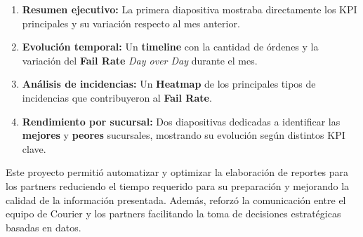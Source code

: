 \begin{enumerate}
	\item \textbf{Resumen ejecutivo:} La primera diapositiva mostraba directamente los KPI principales y su variación respecto al mes anterior.
	\item \textbf{Evolución temporal:} Un \textbf{timeline} con la cantidad de órdenes y la variación del \textbf{Fail Rate} \textit{Day over Day} durante el mes.
	\item \textbf{Análisis de incidencias:} Un \textbf{Heatmap} de los principales tipos de incidencias que contribuyeron al \textbf{Fail Rate}.
	\item \textbf{Rendimiento por sucursal:} Dos diapositivas dedicadas a identificar las \textbf{mejores} y \textbf{peores} sucursales, mostrando su evolución según distintos KPI clave.
\end{enumerate}

Este proyecto permitió automatizar y optimizar la elaboración de reportes para los partners reduciendo el tiempo requerido para su preparación y mejorando la calidad de la información presentada. Además, reforzó la comunicación entre el equipo de Courier y los partners facilitando la toma de decisiones estratégicas basadas en datos.

